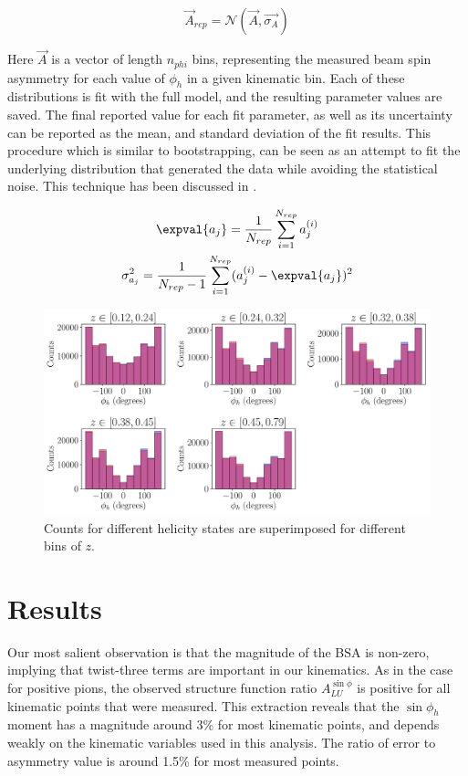 \begin{equation}
  \vec{A}_{rep} = \mathcal{N}(\vec{A}, \vec{\sigma_{A}})
\end{equation}

Here $\vec{A}$ is a vector of length $n_{phi}$ bins, representing the measured beam spin asymmetry for each value of $\phi_h$ in a given kinematic bin.  Each of these distributions is fit with the full model, and the resulting parameter values are saved.  The final reported value for each fit parameter, as well as its uncertainty can be reported as the mean, and standard deviation of the fit results.  This procedure which is similar to bootstrapping, can be seen as an attempt to fit the underlying distribution that generated the data while avoiding the statistical noise.  This technique has been discussed in \cite{computing-watt:2012}.

\begin{gather}
  \expval{a_j} = \frac{1}{N_{rep}} \sum_{i=1}^{N_{rep}} a_{j}^{(i)} \\
  \sigma_{a_j}^{2} = \frac{1}{N_{rep}-1} \sum_{i=1}^{N_{rep}} (a_{j}^{(i)} - \expval{a_j})^2 
\end{gather}

\begin{figure}
	\centering
	\includegraphics[width=16cm]{image/plots/kaon-bsa/z-phi-counts.pdf}
	\caption{Counts for different helicity states are superimposed for different bins of $z$.}
\end{figure}

\section{Results}
Our most salient observation is that the magnitude of the BSA is non-zero, implying that twist-three terms are important in our kinematics.  As in the case for positive pions, the observed structure function ratio $A_{LU}^{\sin\phi}$ is positive for all kinematic points that were measured.  This extraction reveals that the $\sin\phi_h$ moment has a magnitude around 3\% for most kinematic points, and depends weakly on the kinematic variables used in this analysis.  The ratio of error to asymmetry value is around 1.5\% for most measured points.  

